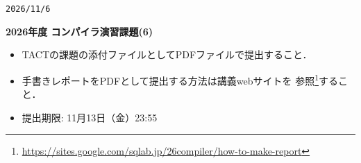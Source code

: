 \documentclass[dvipdfmx]{jarticle}
\begin{document}
\begin{flushright}
\verb|2026/11/6|
\end{flushright}
\begin{center}{\bf\Large
  2026年度 コンパイラ演習課題(6)
}\end{center}
\begin{itemize}
  \item TACTの課題の添付ファイルとしてPDFファイルで提出すること．
  \item 手書きレポートをPDFとして提出する方法は講義webサイトを
  参照\footnote{\url{https://sites.google.com/sqlab.jp/26compiler/how-to-make-report}}すること．
  \item 提出期限: {11月13日（金）23:55}
\end{itemize}

\vspace*{1cm}
\end{document}
